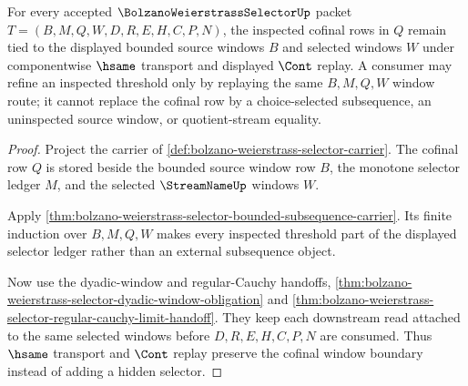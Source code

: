 \begin{theorem}
\label{thm:bolzano-weierstrass-selector-cofinal-window-stability}
For every accepted $\BolzanoWeierstrassSelectorUp$ packet $T=(B,M,Q,W,D,R,E,H,C,P,N)$, the inspected cofinal rows in $Q$ remain tied to the displayed bounded source windows $B$ and selected windows $W$ under componentwise $\hsame$ transport and displayed $\Cont$ replay. A consumer may refine an inspected threshold only by replaying the same $B,M,Q,W$ window route; it cannot replace the cofinal row by a choice-selected subsequence, an uninspected source window, or quotient-stream equality.
\end{theorem}
\begin{proof}
Project the carrier of \autoref{def:bolzano-weierstrass-selector-carrier}. The cofinal row $Q$ is stored beside the bounded source window row $B$, the monotone selector ledger $M$, and the selected $\StreamNameUp$ windows $W$.

Apply \autoref{thm:bolzano-weierstrass-selector-bounded-subsequence-carrier}. Its finite induction over $B,M,Q,W$ makes every inspected threshold part of the displayed selector ledger rather than an external subsequence object.

Now use the dyadic-window and regular-Cauchy handoffs, \autoref{thm:bolzano-weierstrass-selector-dyadic-window-obligation} and \autoref{thm:bolzano-weierstrass-selector-regular-cauchy-limit-handoff}. They keep each downstream read attached to the same selected windows before $D,R,E,H,C,P,N$ are consumed. Thus $\hsame$ transport and $\Cont$ replay preserve the cofinal window boundary instead of adding a hidden selector.
\end{proof}

